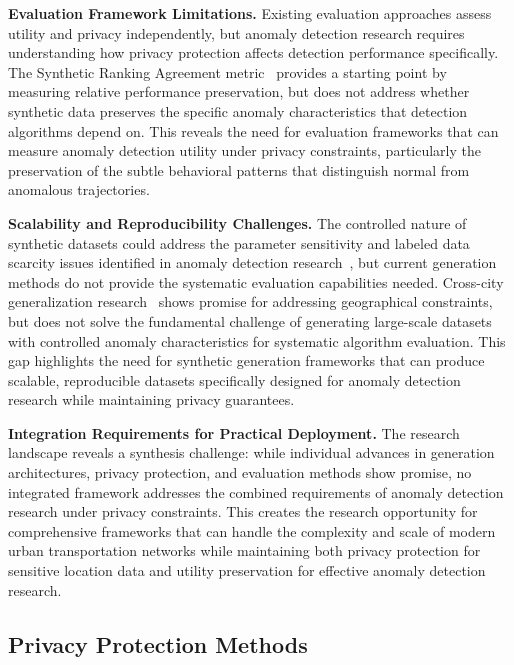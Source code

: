 \documentclass[runningheads]{llncs}
\begin{document}
\textbf{Evaluation Framework Limitations.} Existing evaluation approaches assess utility and privacy independently, but anomaly detection research requires understanding how privacy protection affects detection performance specifically. The Synthetic Ranking Agreement metric~\cite{jordon2019pate} provides a starting point by measuring relative performance preservation, but does not address whether synthetic data preserves the specific anomaly characteristics that detection algorithms depend on. This reveals the need for evaluation frameworks that can measure anomaly detection utility under privacy constraints, particularly the preservation of the subtle behavioral patterns that distinguish normal from anomalous trajectories.

\textbf{Scalability and Reproducibility Challenges.} The controlled nature of synthetic datasets could address the parameter sensitivity and labeled data scarcity issues identified in anomaly detection research~\cite{zhang2019ibat}, but current generation methods do not provide the systematic evaluation capabilities needed. Cross-city generalization research~\cite{wang2025gtg} shows promise for addressing geographical constraints, but does not solve the fundamental challenge of generating large-scale datasets with controlled anomaly characteristics for systematic algorithm evaluation. This gap highlights the need for synthetic generation frameworks that can produce scalable, reproducible datasets specifically designed for anomaly detection research while maintaining privacy guarantees.

\textbf{Integration Requirements for Practical Deployment.} The research landscape reveals a synthesis challenge: while individual advances in generation architectures, privacy protection, and evaluation methods show promise, no integrated framework addresses the combined requirements of anomaly detection research under privacy constraints. This creates the research opportunity for comprehensive frameworks that can handle the complexity and scale of modern urban transportation networks while maintaining both privacy protection for sensitive location data and utility preservation for effective anomaly detection research.

\subsection{Privacy Protection Methods}
\label{sec:privacy-review}
\end{document}

